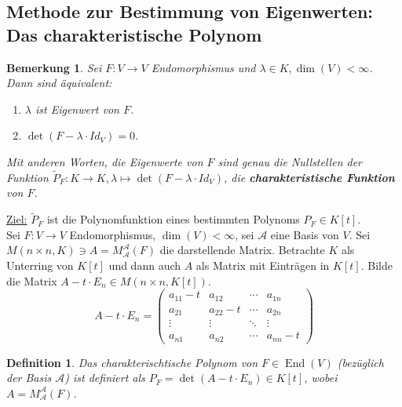 \documentclass[12pt,a4paper]{article}
\theoremstyle{plain}
\newtheorem{Definition}[Theorem]{Definition}
\newtheorem{Bemerkung}[Theorem]{Bemerkung}
\numberwithin{equation}{section}
\begin{document}
\subsection{Methode zur Bestimmung von Eigenwerten: Das charakteristische Polynom}
\begin{Bemerkung}
Sei $F:V\rightarrow V$ Endomorphismus und $\lambda \in K, \dim(V)<\infty$. Dann sind äquivalent: \begin{enumerate}
\renewcommand{\labelenumi}{\roman{enumi})}
\item $\lambda$ ist Eigenwert von $F$.
\item $\det(F-\lambda\cdot Id_V) = 0$.
\end{enumerate}
Mit anderen Worten, die Eigenwerte von $F$ sind genau die Nullstellen der Funktion $\tilde{P}_F : K\rightarrow K, \lambda \mapsto \det(F - \lambda\cdot Id_V)$, die \textbf{charakteristische Funktion} von $F$.
\end{Bemerkung}
\underline{Ziel:} $\tilde{P}_F$ ist die Polynomfunktion eines bestimmten Polynoms $P_F\in K[t]$.\\
Sei $F:V\rightarrow V$ Endomorphismus, $\dim(V)<\infty$, sei $\mathcal{A}$ eine Basis von $V$. Sei $M(n\times n,K) \ni A=M_\mathcal{A}^\mathcal{A}(F)$ die darstellende Matrix. Betrachte $K$ als Unterring von $K[t]$ und dann auch $A$ als Matrix mit Einträgen in $K[t]$. Bilde die Matrix $A-t\cdot E_n \in M(n\times n, K[t])$.\[
A-t\cdot E_n = \begin{pmatrix}
a_{11}-t & a_{12} & \cdots & a_{1n} \\
a_{21} & a_{22}-t & \cdots & a_{2n} \\
\vdots & \vdots & \ddots & \vdots \\
a_{n1} & a_{n2} & \cdots & a_{nn}-t
\end{pmatrix}
\]
\begin{Definition}
Das charakterischtische Polynom von $F\in\operatorname{End}(V)$ (bezüglich der Basis $\mathcal{A}$) ist definiert als $P_F=\det(A-t\cdot E_n)\in K[t]$, wobei $A=M_\mathcal{A}^\mathcal{A}(F)$.
\end{Definition}
\end{document}
